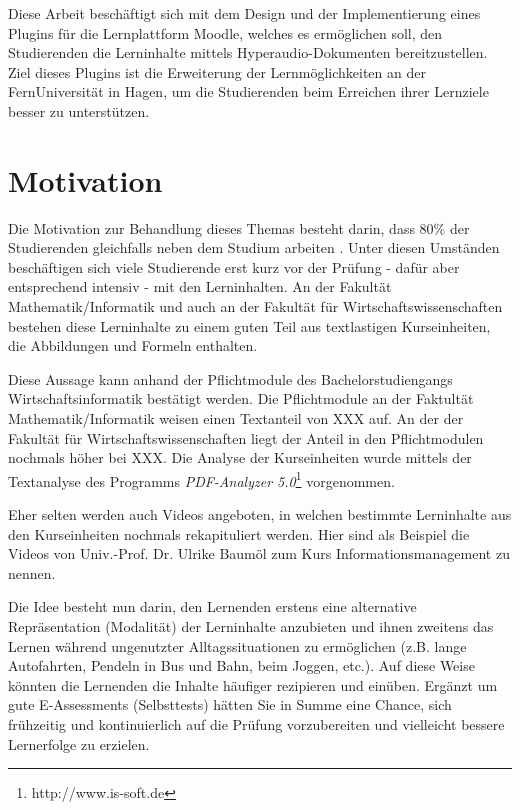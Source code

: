 \label{cha:einfuehrung}
Diese Arbeit beschäftigt sich mit dem Design und der Implementierung eines Plugins für die Lernplattform Moodle, welches es ermöglichen soll, den Studierenden die Lerninhalte mittels Hyperaudio-Dokumenten bereitzustellen. Ziel dieses Plugins ist die Erweiterung der Lernmöglichkeiten an der FernUniversität in Hagen, um die Studierenden beim Erreichen ihrer Lernziele besser zu unterstützen. 


\section{Motivation}
\label{sec:motivation}
Die Motivation zur Behandlung dieses Themas besteht darin, dass 
80\% der Studierenden gleichfalls neben dem Studium arbeiten \citep{fernuniversitaet2018stat}. Unter diesen Umständen beschäftigen sich viele Studierende erst kurz vor der Prüfung - dafür aber entsprechend intensiv - mit den Lerninhalten. An der Fakultät Mathematik/Informatik und auch an der Fakultät für Wirtschaftswissenschaften bestehen diese Lerninhalte zu einem guten Teil aus textlastigen Kurseinheiten, die Abbildungen und Formeln enthalten.


Diese Aussage kann anhand der Pflichtmodule des Bachelorstudiengangs Wirtschaftsinformatik bestätigt werden.
Die Pflichtmodule an der Faktultät Mathematik/Informatik weisen einen Textanteil von XXX auf. An der der Fakultät für Wirtschaftswissenschaften liegt der Anteil in den Pflichtmodulen nochmals höher bei XXX. Die Analyse der Kurseinheiten wurde mittels der Textanalyse des Programms \textit{PDF-Analyzer 5.0}\footnote{http://www.is-soft.de} vorgenommen.

Eher selten werden auch Videos angeboten, in welchen bestimmte Lerninhalte aus den Kurseinheiten nochmals rekapituliert werden. Hier sind als Beispiel die Videos von Univ.-Prof. Dr. Ulrike Baumöl zum Kurs \glqq Informationsmanagement\grqq{} zu nennen.

Die Idee besteht nun darin, den Lernenden erstens eine alternative Repräsentation (Modalität) der Lerninhalte anzubieten und ihnen zweitens das Lernen während ungenutzter Alltagssituationen zu ermöglichen (z.B. lange Autofahrten, Pendeln in Bus und Bahn, beim Joggen, etc.). Auf diese Weise könnten die Lernenden die Inhalte häufiger rezipieren und einüben. Ergänzt um gute E-Assessments (Selbsttests) hätten Sie in Summe eine Chance, sich frühzeitig und kontinuierlich auf die Prüfung vorzubereiten und vielleicht bessere Lernerfolge zu erzielen. 


